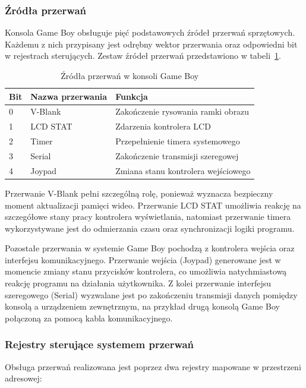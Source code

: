 \documentclass{article}
\begin{document}
\subsubsection{Źródła przerwań}

Konsola Game Boy obsługuje pięć podstawowych źródeł przerwań sprzętowych. Każdemu z nich przypisany jest odrębny wektor przerwania oraz odpowiedni bit w rejestrach sterujących. Zestaw źródeł przerwań przedstawiono w tabeli~\ref{tab:gb_interrupts}.

\begin{table}[h]
	\centering
	\begin{tabular}{lll}
		\hline
		Bit & Nazwa przerwania & Funkcja \\
		\hline
		0 & V-Blank & Zakończenie rysowania ramki obrazu \\
		1 & LCD STAT & Zdarzenia kontrolera LCD \\
		2 & Timer & Przepełnienie timera systemowego \\
		3 & Serial & Zakończenie transmisji szeregowej \\
		4 & Joypad & Zmiana stanu kontrolera wejściowego \\
		\hline
	\end{tabular}
	\caption{Źródła przerwań w konsoli Game Boy\cite{pandocs}}
	\label{tab:gb_interrupts}
\end{table}

Przerwanie V-Blank pełni szczególną rolę, ponieważ wyznacza bezpieczny moment aktualizacji pamięci wideo. Przerwanie LCD STAT umożliwia reakcję na szczegółowe stany pracy kontrolera wyświetlania, natomiast przerwanie timera wykorzystywane jest do odmierzania czasu oraz synchronizacji logiki programu.

Pozostałe przerwania w systemie Game Boy pochodzą z kontrolera wejścia oraz interfejsu komunikacyjnego. Przerwanie wejścia (Joypad) generowane jest w momencie zmiany stanu przycisków kontrolera, co umożliwia natychmiastową reakcję programu na działania użytkownika. Z kolei przerwanie interfejsu szeregowego (Serial) wyzwalane jest po zakończeniu transmisji danych pomiędzy konsolą a urządzeniem zewnętrznym, na przykład drugą konsolą Game Boy połączoną za pomocą kabla komunikacyjnego.

\subsubsection{Rejestry sterujące systemem przerwań}

Obsługa przerwań realizowana jest poprzez dwa rejestry mapowane w przestrzeni adresowej:
\end{document}
